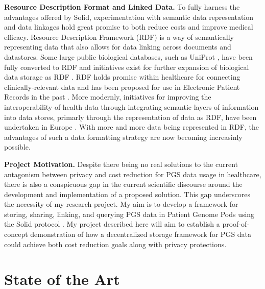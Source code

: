 \documentclass[runningheads]{llncs}
\begin{document}
\textbf{Resource Description Format and Linked Data.}
To fully harness the advantages offered by Solid, experimentation with semantic data representation and data linkages hold great promise to both reduce costs and improve medical efficacy.
Resource Description Framework (RDF) is a way of semantically representing data that also allows for data linking across documents and datastores.
Some large public biological databases, such as UniProt \cite{theuniprotconsortium_uniprot_2017}, have been fully converted to RDF and initiatives exist for further expansion of biological data storage as RDF \cite{sib_swiss_institute_of_bioinformatics_rdf_group_members_sib_2024}.
RDF holds promise within healthcare for connecting clinically-relevant data and has been proposed for use in Electronic Patient Records in the past \cite{lindemann_resource_2008}.
More modernly, initiatives for improving the interoperability of health data through integrating semantic layers of information into data stores, primarly through the representation of data as RDF, have been undertaken in Europe \cite{van_der_horst_bridging_2023}.
With more and more data being represented in RDF, the advantages of such a data formatting strategy are now becoming increasinly possible.

\textbf{Project Motivation.}
Despite there being no real solutions to the current antagonism between privacy and cost reduction for PGS data usage in healthcare, there is also a conspicuous gap in the current scientific discourse around the development and implementation of a proposed solution. 
This gap underscores the necessity of my research project.
My aim is to develop a framework for storing, sharing, linking, and querying PGS data in Patient Genome Pods using the Solid protocol \cite{capadisli_solid_nodate}.
My project described here will aim to establish a proof-of-concept demonstration of how a decentralized storage framework for PGS data could achieve both cost reduction goals along with privacy protections.


\section{State of the Art}

\end{document}

